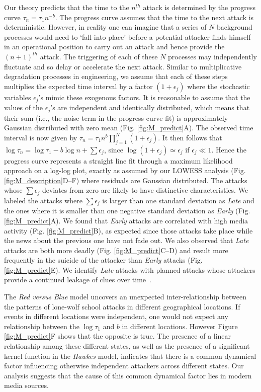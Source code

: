 Our theory predicts that the time to the $n^{th}$ attack is determined
by the progress curve $\tau_n = \tau_1 n^{-b}$.
The progress curve assumes that the time to the next attack is
deterministic. However, in reality one can imagine that a series of
$N$ background processes would need to `fall into place' before a
potential attacker finds himself in an operational position to carry
out an attack and hence provide the $(n+1)^{th}$ attack. The
triggering of each of these $N$ processes may independently fluctuate
and so delay or accelerate the next attack. Similar to multiplicative
degradation processes in engineering, we assume that each of these
steps multiplies the expected time interval by a factor $(1+
\epsilon_j)$ where the stochastic variables $\epsilon_j$'s mimic these
exogenous factors. 
It is reasonable to assume that the values of the $\epsilon_j$'s are
independent and identically distributed, which means that their sum
(i.e., the noise term in the progress curve fit) is approximately
Gaussian distributed with zero mean (Fig. \ref{fig:M_predict}A). 
The observed time interval is now given by $\tau_n = \tau_1 n^b
\prod^N_{j=1}{(1+\epsilon_j)}$. 
It then follows that $\log{\tau_n} = \log{\tau_1} -b \log{n} +
\sum{\epsilon_j}$, since $\log{(1+\epsilon_j)} \simeq \epsilon_j$ if
$\epsilon_j \ll 1$. Hence the progress curve represents a straight
line fit through a maximum likelihood approach on a log-log plot,
exactly as assumed by our LOWESS analysis
(Fig. \ref{fig:M_description}D--F) where residuals are Gaussian
distributed. 
The attacks whose $\sum{\epsilon_j}$ deviates from zero are likely to
have distinctive characteristics. 
We labeled the attacks where $\sum{\epsilon_j}$ is larger than one
standard deviation as \textit{Late} and the ones where it is smaller
than one negative standard deviation as \textit{Early}
(Fig. \ref{fig:M_predict}A). 
We found that \textit{Early} attacks are correlated with high media
activity (Fig. \ref{fig:M_predict}B), as expected since those attacks
take place while the news about the previous one have not fade out. 
We also observed that \textit{Late} attacks are both more deadly
(Fig. \ref{fig:M_predict}C--D) and result more frequently in the
suicide of the attacker than \textit{Early} attacks
(Fig. \ref{fig:M_predict}E). 
We identify \textit{Late} attacks with planned attacks whose attackers
provide a continued leakage of clues over time~\cite{O2000}.

The \textit{Red versus Blue} model uncovers an unexpected
inter-relationship between the patterns of lone-wolf school attacks in
different geographical locations. 
If events in different locations were independent, one would not
expect any relationship between the $\log{\tau_1}$ and $b$ in
different locations. 
However Figure \ref{fig:M_predict}F shows that the opposite is true. 
The presence of a linear relationship among these different states, as
well as the presence of a significant kernel function in the
\textit{Hawkes} model, indicates that there is a common dynamical
factor influencing otherwise independent attackers across different
states. 
Our analysis suggests that the cause of this common dynamical factor
lies in modern media sources. 


